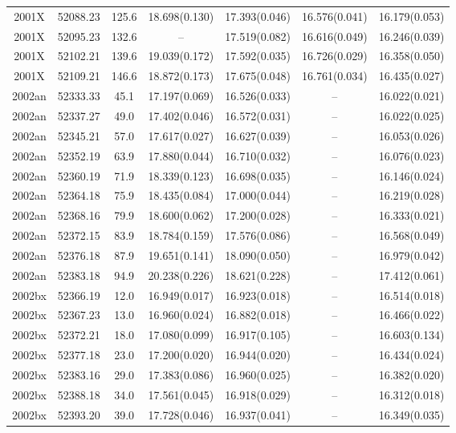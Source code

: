 \begin{table*}
\begin{tabular}{ccccccc}
2001X	  & 52088.23	 & 125.6	& 18.698(0.130)	 & 17.393(0.046)	 & 16.576(0.041)	 & 16.179(0.053) \\ 
2001X	  & 52095.23	 & 132.6	& --	 & 17.519(0.082)	 & 16.616(0.049)	 & 16.246(0.039) \\ 
2001X	  & 52102.21	 & 139.6	& 19.039(0.172)	 & 17.592(0.035)	 & 16.726(0.029)	 & 16.358(0.050) \\ 
2001X	  & 52109.21	 & 146.6	& 18.872(0.173)	 & 17.675(0.048)	 & 16.761(0.034)	 & 16.435(0.027) \\ 
2002an	  & 52333.33	 & 45.1	& 17.197(0.069)	 & 16.526(0.033)	 & --	 & 16.022(0.021) \\ 
2002an	  & 52337.27	 & 49.0	& 17.402(0.046)	 & 16.572(0.031)	 & --	 & 16.022(0.025) \\ 
2002an	  & 52345.21	 & 57.0	& 17.617(0.027)	 & 16.627(0.039)	 & --	 & 16.053(0.026) \\ 
2002an	  & 52352.19	 & 63.9	& 17.880(0.044)	 & 16.710(0.032)	 & --	 & 16.076(0.023) \\ 
2002an	  & 52360.19	 & 71.9	& 18.339(0.123)	 & 16.698(0.035)	 & --	 & 16.146(0.024) \\ 
2002an	  & 52364.18	 & 75.9	& 18.435(0.084)	 & 17.000(0.044)	 & --	 & 16.219(0.028) \\ 
2002an	  & 52368.16	 & 79.9	& 18.600(0.062)	 & 17.200(0.028)	 & --	 & 16.333(0.021) \\ 
2002an	  & 52372.15	 & 83.9	& 18.784(0.159)	 & 17.576(0.086)	 & --	 & 16.568(0.049) \\ 
2002an	  & 52376.18	 & 87.9	& 19.651(0.141)	 & 18.090(0.050)	 & --	 & 16.979(0.042) \\ 
2002an	  & 52383.18	 & 94.9	& 20.238(0.226)	 & 18.621(0.228)	 & --	 & 17.412(0.061) \\ 
2002bx	  & 52366.19	 & 12.0	& 16.949(0.017)	 & 16.923(0.018)	 & --	 & 16.514(0.018) \\ 
2002bx	  & 52367.23	 & 13.0	& 16.960(0.024)	 & 16.882(0.018)	 & --	 & 16.466(0.022) \\ 
2002bx	  & 52372.21	 & 18.0	& 17.080(0.099)	 & 16.917(0.105)	 & --	 & 16.603(0.134) \\ 
2002bx	  & 52377.18	 & 23.0	& 17.200(0.020)	 & 16.944(0.020)	 & --	 & 16.434(0.024) \\ 
2002bx	  & 52383.16	 & 29.0	& 17.383(0.086)	 & 16.960(0.025)	 & --	 & 16.382(0.020) \\ 
2002bx	  & 52388.18	 & 34.0	& 17.561(0.045)	 & 16.918(0.029)	 & --	 & 16.312(0.018) \\ 
2002bx	  & 52393.20	 & 39.0	& 17.728(0.046)	 & 16.937(0.041)	 & --	 & 16.349(0.035) \\ 

\end{tabular}
\end{table*}
